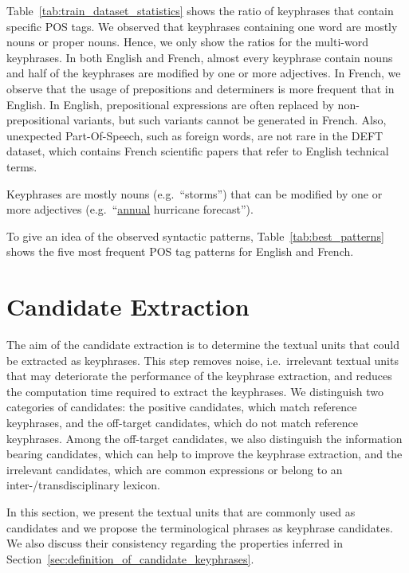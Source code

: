     Table~\ref{tab:train_dataset_statistics} shows the ratio of keyphrases that
    contain specific POS tags. We observed that keyphrases containing one word
    are mostly nouns or proper nouns. Hence, we only show the ratios for the
    multi-word keyphrases. In both English and French, almost every keyphrase
    contain nouns and half of the keyphrases are modified by one or more
    adjectives. In French, we observe that the usage of prepositions and
    determiners is more frequent that in English. In English, prepositional
    expressions are often replaced by non-prepositional variants, but such
    variants cannot be generated in French. Also, unexpected Part-Of-Speech, such
    as foreign words, are not rare in the DEFT dataset, which contains French
    scientific papers that refer to English technical terms.

    \begin{property}\label{prop:noun_phrases}
      Keyphrases are mostly nouns (e.g.~``storms'') that can be modified by one
      or more adjectives (e.g.~``\underline{annual} hurricane forecast'').
    \end{property}

    To give an idea of the observed syntactic patterns,
    Table~\ref{tab:best_patterns} shows the five most frequent POS tag patterns
    for English and French.

\section{Candidate Extraction}
\label{sec:candidate_extraction}
  The aim of the candidate extraction is to determine the textual units that
  could be extracted as keyphrases. This step removes noise, i.e.~irrelevant
  textual units that may deteriorate the performance of the keyphrase
  extraction, and reduces the computation time required to extract the
  keyphrases. We distinguish two categories of candidates: the positive
  candidates, which match reference keyphrases, and the off-target candidates,
  which do not match reference keyphrases. Among the off-target candidates, we
  also distinguish the information bearing candidates, which can help to improve
  the keyphrase extraction, and the irrelevant candidates, which are common
  expressions or belong to an inter-/transdisciplinary lexicon.

  In this section, we present the textual units that are commonly used as
  candidates and we propose the terminological phrases as keyphrase candidates.
  We also discuss their consistency regarding the properties inferred in
  Section~\ref{sec:definition_of_candidate_keyphrases}.

